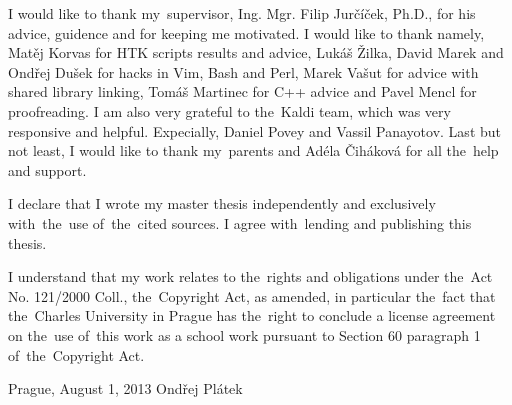 \newpage

\normalsize %
\vspace{10mm} 

\noindent I would like to thank my~supervisor, Ing. Mgr. Filip Jurčíček, Ph.D., for his advice, guidence and 
for keeping me motivated. 
I would like to thank namely, Matěj Korvas for HTK scripts results and advice, 
Lukáš Žilka, David Marek and Ondřej Dušek for hacks in Vim, Bash and Perl, 
Marek Vašut for advice with shared library linking, Tomáš Martinec for C++ advice
and Pavel Mencl for proofreading.
I am also very grateful to the~Kaldi team, which was very responsive and helpful.
Expecially, Daniel Povey and  Vassil Panayotov. 
Last but not least, I would like to thank my~parents and Adéla Čiháková for all the~help and support.


\vspace{\fill} %
\medskip\noindent
I declare that I wrote my master thesis independently and exclusively with~the~use of~the~cited sources. I agree with~lending and publishing this thesis.

I understand that my work relates to the~rights and obligations under the~Act No. 121/2000 Coll., the~Copyright Act, as amended, in particular the~fact that the~Charles University in Prague has the~right to conclude a license agreement on the~use of~this work as a school work pursuant to Section 60 paragraph 1 of~the~Copyright Act.

\noindent Prague, August 1, 2013 \hspace{\fill}Ondřej Plátek 


\newpage

